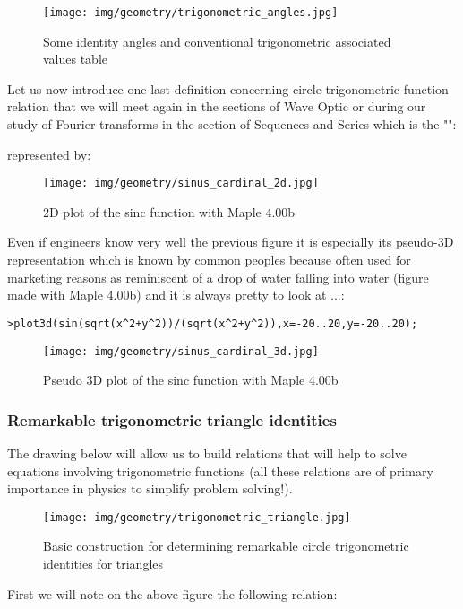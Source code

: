 	\begin{figure}[H]
		\centering
		\texttt{[image: img/geometry/trigonometric\_angles.jpg]}
		\caption{Some identity angles and conventional trigonometric associated values table}
	\end{figure}
	Let us now introduce one last definition concerning circle trigonometric function relation that we will meet again in the sections of Wave Optic or during our study of Fourier transforms in the section of Sequences and Series which is the "\label{sinc cardinal}":
	
	represented by:
	\begin{figure}[H]
		\centering
		\texttt{[image: img/geometry/sinus\_cardinal\_2d.jpg]}
		\caption{2D plot of the sinc function with Maple 4.00b}
	\end{figure}
	Even if engineers know very well the previous figure it is especially its pseudo-3D representation which is known by common peoples because often used for marketing reasons as reminiscent of a drop of water falling into water (figure made with Maple 4.00b) and it is always pretty to look at ...:

\texttt{>plot3d(sin(sqrt(x\string^2+y\string^2))/(sqrt(x\string^2+y\string^2)),x=-20..20,y=-20..20);}

\begin{figure}[H]
\centering
\texttt{[image: img/geometry/sinus\_cardinal\_3d.jpg]}
\caption{Pseudo 3D plot of the sinc function with Maple 4.00b}
\end{figure}

	\subsubsection{Remarkable trigonometric triangle identities}\label{remarkable trigonometric identities}
	The drawing below will allow us to build relations that will help to solve equations involving trigonometric functions (all these relations are of primary importance in physics to simplify problem solving!).

\begin{figure}[H]
\centering
\texttt{[image: img/geometry/trigonometric\_triangle.jpg]}
\caption{Basic construction for determining remarkable circle trigonometric identities for triangles}
\end{figure}

	First we will note on the above figure the following relation:
	
